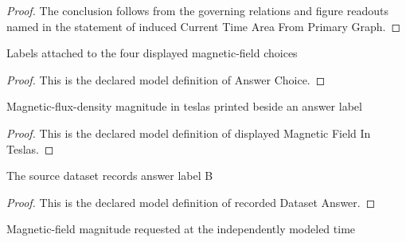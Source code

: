 \begin{proof}
  The conclusion follows from the governing relations and figure readouts named in the statement of induced Current Time Area From Primary Graph.
\end{proof}
\begin{definition}
  \label{def:physics:phyx-mini-0980:phyxminiproblems-problemphyxmini0980-answerchoice}
  Labels attached to the four displayed magnetic-field choices
\end{definition}
\begin{proof}
  This is the declared model definition of Answer Choice.
\end{proof}
\begin{definition}
  \label{def:physics:phyx-mini-0980:phyxminiproblems-problemphyxmini0980-answerchoice-displayedmagneticfieldinteslas}
  Magnetic-flux-density magnitude in teslas printed beside an answer label
\end{definition}
\begin{proof}
  This is the declared model definition of displayed Magnetic Field In Teslas.
\end{proof}
\begin{definition}
  \label{def:physics:phyx-mini-0980:phyxminiproblems-problemphyxmini0980-recordeddatasetanswer}
  The source dataset records answer label B
\end{definition}
\begin{proof}
  This is the declared model definition of recorded Dataset Answer.
\end{proof}
\begin{definition}
  \label{def:physics:phyx-mini-0980:phyxminiproblems-problemphyxmini0980-observedmagneticfieldinteslas}
  Magnetic-field magnitude requested at the independently modeled time
\end{definition}
